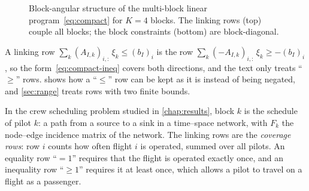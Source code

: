 \begin{figure}[ht]
\centering
{}
\caption{Block-angular structure of the multi-block linear program~\eqref{eq:compact} for
$K = 4$ blocks. The linking rows (top) couple all blocks; the block constraints (bottom) are
block-diagonal.}
\label{fig:block-angular}
\end{figure}

\begin{remark} \label{rem:le-rows}
A linking row $\sum_k (A_{I,k})_{i,:}\,\xi_k \le (b_I)_i$ is the row
$\sum_k (-A_{I,k})_{i,:}\,\xi_k \ge -(b_I)_i$, so the form~\eqref{eq:compact-ineq} covers both
directions, and the text only treats ``$\ge$'' rows.  shows how a ``$\le$''
row can be kept as it is instead of being negated, and \cref{sec:range} treats rows with two
finite bounds.
\end{remark}

\begin{example} \label{ex:crew}
In the crew scheduling problem studied in \cref{chap:results}, block $k$ is the schedule of
pilot $k$: a path from a source to a sink in a time--space network, with $F_k$ the
node--edge incidence matrix of the network. The linking rows are the \emph{coverage rows}:
row $i$ counts how often flight $i$ is operated, summed over all pilots. An equality row
``$=1$'' requires that the flight is operated exactly once, and an inequality row ``$\ge 1$''
requires it at least once, which allows a pilot to travel on a flight as a passenger.
\end{example}


